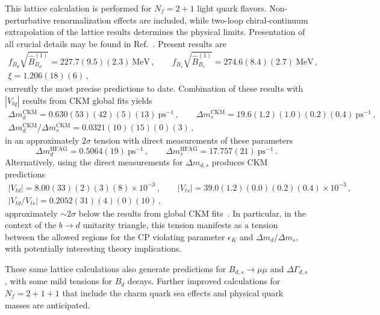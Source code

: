This lattice calculation is performed for $N_f = 2+1$ light quark flavors. Non-perturbative renormalization effects are included, while two-loop chiral-continuum extrapolation of the lattice results determines the physical limits. Presentation of all crucial details may be found in Ref.~\cite{Bazavov:2016nty}. Present results are
\begin{gather}
	f_{B_d}\sqrt{\hat{B}^{(1)}_{B_d}} = 227.7(9.5)(2.3)~\text{MeV}\,, \qquad f_{B_s}\sqrt{\hat{B}^{(1)}_{B_s}} = 274.6(8.4)(2.7)~\text{MeV}\,,\nonumber\\
		\xi = 1.206(18)(6)\,,
\end{gather}
currently the most precise predictions to date. Combination of these results with $|V_{tq}|$ results from CKM global fits yields 
\begin{gather}
	\Delta m^{\text{CKM}}_d = 0.630(53)(42)(5)(13)~\text{ps}^{-1}\,, \qquad \Delta m^{\text{CKM}}_s = 19.6(1.2)(1.0)(0.2)(0.4)~\text{ps}^{-1}\,,\nonumber \\
	\Delta m^{\text{CKM}}_d/\Delta m^{\text{CKM}}_s = 0.0321(10)(15)(0)(3)\,,
\end{gather}
in an approximately $2\sigma$ tension with direct measurements of these parameters \cite{HFAG}
\begin{equation}
	\Delta m^{\text{HFAG}}_d = 0.5064(19)~\text{ps}^{-1}\,,\qquad \Delta m^{\text{HFAG}}_s = 17.757(21)~\text{ps}^{-1}\,.
\end{equation}
Alternatively, using the direct measurements for $\Delta m_{d,s}$ produces CKM predictions
\begin{gather}
	|V_{td}| = 8.00(33)(2)(3)(8)\times 10^{-3}\,,\qquad |V_{ts}| = 39.0(1.2)(0.0)(0.2)(0.4)\times 10^{-3}\,,\nonumber\\
	|V_{td}/V_{ts}| = 0.2052(31)(4)(0)(10)\,,
\end{gather}
approximately $\sim2\sigma$ below the results from global CKM fits~\cite{Charles:2004jd, Charles:2015gya}. In particular, in the context of the $b \to d$ unitarity triangle, this tension manifests as a tension between the allowed regions for the CP violating parameter $\epsilon_K$ and $\Delta m_{d}/\Delta m_s$, with potentially interesting theory implications. 

These same lattice calculations also generate predictions for $B_{d,s} \to \mu\mu$ and $\Delta\Gamma_{d,s}$, with some mild tensions for $B_d$ decays. Further improved calculations for $N_f = 2 + 1 + 1$ that include the charm quark sea effects and physical quark masses are anticipated.

